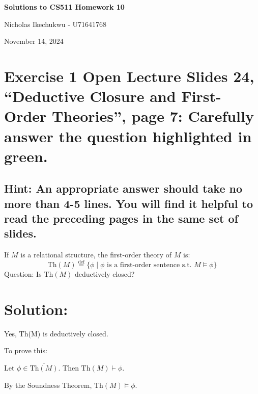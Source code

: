 \documentclass{article}
\begin{document}
\begin{center}
    \Large\textbf{Solutions to CS511 Homework 10}
    
    \vspace{0.5cm}
    
    \large Nicholas Ikechukwu - U71641768
    
    \vspace{0.3cm}
    
    \large November 14, 2024
\end{center}



\section*{Exercise 1 Open Lecture Slides 24, “Deductive Closure and First-Order Theories”, page 7:
Carefully answer the question highlighted in green.}

\subsection*{Hint: An appropriate answer should take no more than 4-5 lines. You will find it helpful to read the
preceding pages in the same set of slides. }

\begin{mdframed}
    If $M$ is a relational structure, the first-order theory of $M$ is:
\[
\text{Th}(M) \stackrel{\text{def}}{=} \{ \phi \mid \phi \text{ is a first-order sentence s.t. } M \models \phi \}
\]
Question: Is $\text{Th}(M)$ deductively closed?

\vspace{1em} 
    
\end{mdframed}
\section*{Solution:}

Yes, Th(M) is deductively closed.


\vspace{1em}

\vspace{1em}
To prove this:

\vspace{1em}
Let $\phi \in \overline{\text{Th}(M)}$. Then $\text{Th}(M) \vdash \phi$.

\vspace{1em}
By the Soundness Theorem, $\text{Th}(M) \models \phi$.
\end{document}

